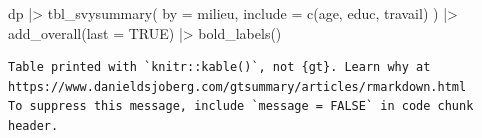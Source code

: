 \documentclass[
  letterpaper,
  DIV=11,
  numbers=noendperiod,
  oneside]{scrreprt}
\newenvironment{Shaded}{\begin{snugshade}}{\end{snugshade}}
\newcommand{\AttributeTok}[1]{\textcolor[rgb]{0.40,0.45,0.13}{#1}}
\newcommand{\ConstantTok}[1]{\textcolor[rgb]{0.56,0.35,0.01}{#1}}
\newcommand{\FunctionTok}[1]{\textcolor[rgb]{0.28,0.35,0.67}{#1}}
\newcommand{\NormalTok}[1]{\textcolor[rgb]{0.00,0.23,0.31}{#1}}
\newcommand{\SpecialCharTok}[1]{\textcolor[rgb]{0.37,0.37,0.37}{#1}}
\begin{document}
\begin{Shaded}
\begin{Highlighting}[]
\NormalTok{dp }\SpecialCharTok{|\textgreater{}} 
  \FunctionTok{tbl\_svysummary}\NormalTok{(}
    \AttributeTok{by =}\NormalTok{ milieu,}
    \AttributeTok{include =} \FunctionTok{c}\NormalTok{(age, educ, travail)}
\NormalTok{  ) }\SpecialCharTok{|\textgreater{}} 
  \FunctionTok{add\_overall}\NormalTok{(}\AttributeTok{last =} \ConstantTok{TRUE}\NormalTok{) }\SpecialCharTok{|\textgreater{}} 
  \FunctionTok{bold\_labels}\NormalTok{()}
\end{Highlighting}
\end{Shaded}

\begin{verbatim}
Table printed with `knitr::kable()`, not {gt}. Learn why at
https://www.danieldsjoberg.com/gtsummary/articles/rmarkdown.html
To suppress this message, include `message = FALSE` in code chunk header.
\end{verbatim}
\end{document}
